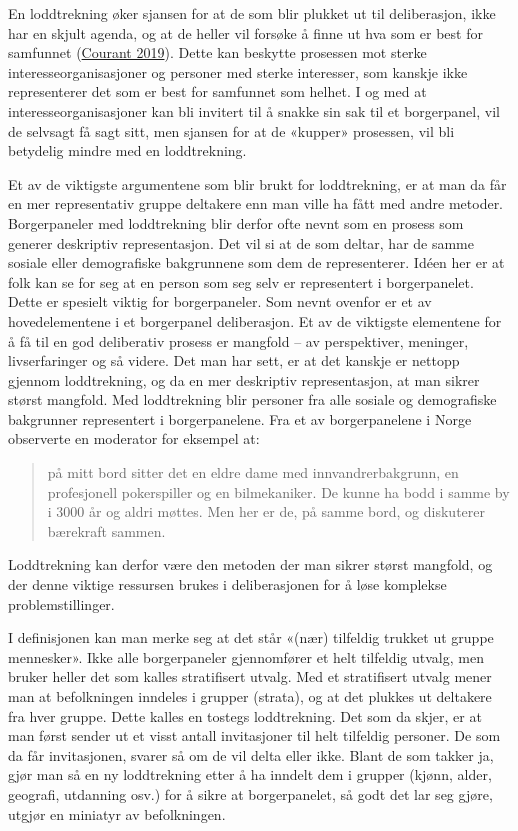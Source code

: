 \documentclass[
  12pt,
  a4paper, 12pt]{article}
\begin{document}
En loddtrekning øker sjansen for at de som blir plukket ut til deliberasjon, ikke har en skjult agenda, og at de heller vil forsøke å finne ut hva som er best for samfunnet (\protect\hyperlink{ref-courant_sortition_2019}{Courant 2019}). Dette kan beskytte prosessen mot sterke interesseorganisasjoner og personer med sterke interesser, som kanskje ikke representerer det som er best for samfunnet som helhet. I og med at interesseorganisasjoner kan bli invitert til å snakke sin sak til et borgerpanel, vil de selvsagt få sagt sitt, men sjansen for at de «kupper» prosessen, vil bli betydelig mindre med en loddtrekning.

Et av de viktigste argumentene som blir brukt for loddtrekning, er at man da får en mer representativ gruppe deltakere enn man ville ha fått med andre metoder. Borgerpaneler med loddtrekning blir derfor ofte nevnt som en prosess som generer deskriptiv representasjon. Det vil si at de som deltar, har de samme sosiale eller demografiske bakgrunnene som dem de representerer. Idéen her er at folk kan se for seg at en person som seg selv er representert i borgerpanelet. Dette er spesielt viktig for borgerpaneler. Som nevnt ovenfor er et av hovedelementene i et borgerpanel deliberasjon. Et av de viktigste elementene for å få til en god deliberativ prosess er mangfold -- av perspektiver, meninger, livserfaringer og så videre. Det man har sett, er at det kanskje er nettopp gjennom loddtrekning, og da en mer deskriptiv representasjon, at man sikrer størst mangfold. Med loddtrekning blir personer fra alle sosiale og demografiske bakgrunner representert i borgerpanelene. Fra et av borgerpanelene i Norge observerte en moderator for eksempel at:

\begin{quote}
på mitt bord sitter det en eldre dame med innvandrerbakgrunn, en profesjonell pokerspiller og en bilmekaniker. De kunne ha bodd i samme by i 3000 år og aldri møttes. Men her er de, på samme bord, og diskuterer bærekraft sammen.
\end{quote}

Loddtrekning kan derfor være den metoden der man sikrer størst mangfold, og der denne viktige ressursen brukes i deliberasjonen for å løse komplekse problemstillinger.

I definisjonen kan man merke seg at det står «(nær) tilfeldig trukket ut gruppe mennesker». Ikke alle borgerpaneler gjennomfører et helt tilfeldig utvalg, men bruker heller det som kalles stratifisert utvalg. Med et stratifisert utvalg mener man at befolkningen inndeles i grupper (strata), og at det plukkes ut deltakere fra hver gruppe. Dette kalles en tostegs loddtrekning. Det som da skjer, er at man først sender ut et visst antall invitasjoner til helt tilfeldig personer. De som da får invitasjonen, svarer så om de vil delta eller ikke. Blant de som takker ja, gjør man så en ny loddtrekning etter å ha inndelt dem i grupper (kjønn, alder, geografi, utdanning osv.) for å sikre at borgerpanelet, så godt det lar seg gjøre, utgjør en miniatyr av befolkningen.
\end{document}

